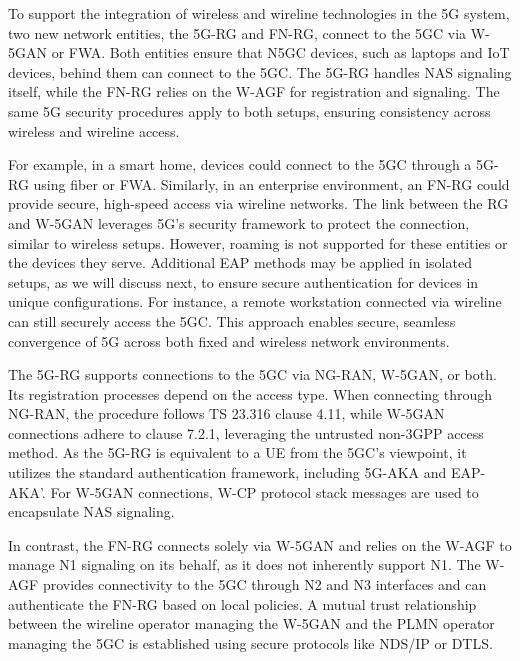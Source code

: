 To support the integration of wireless and wireline technologies in the \ac{5G} system, two new network entities, the \ac{5G-RG} and \ac{FN-RG}, connect to the \ac{5GC} via \ac{W-5GAN} or \ac{FWA}. Both entities ensure that \ac{N5GC} devices, such as laptops and \ac{IoT} devices, behind them can connect to the \ac{5GC}. The \ac{5G-RG} handles \ac{NAS} signaling itself, while the \ac{FN-RG} relies on the \ac{W-AGF} for registration and signaling. The same \ac{5G} security procedures apply to both setups, ensuring consistency across wireless and wireline access.

For example, in a smart home, devices could connect to the \ac{5GC} through a \ac{5G-RG} using fiber or \ac{FWA}. Similarly, in an enterprise environment, an \ac{FN-RG} could provide secure, high-speed access via wireline networks. The link between the \ac{RG} and \ac{W-5GAN} leverages \ac{5G}’s security framework to protect the connection, similar to wireless setups. However, roaming is not supported for these entities or the devices they serve. Additional \ac{EAP} methods may be applied in isolated setups, as we will discuss next, to ensure secure authentication for devices in unique configurations. For instance, a remote workstation connected via wireline can still securely access the \ac{5GC}. This approach enables secure, seamless convergence of \ac{5G} across both fixed and wireless network environments.

The \ac{5G-RG} supports connections to the \ac{5GC} via \ac{NG-RAN}, \ac{W-5GAN}, or both. Its registration processes depend on the access type. When connecting through \ac{NG-RAN}, the procedure follows TS 23.316 clause 4.11, while \ac{W-5GAN} connections adhere to clause 7.2.1, leveraging the untrusted non-\ac{3GPP} access method. As the \ac{5G-RG} is equivalent to a \ac{UE} from the \ac{5GC}’s viewpoint, it utilizes the standard authentication framework, including \ac{5G-AKA} and \ac{EAP-AKA’}. For \ac{W-5GAN} connections, \ac{W-CP} protocol stack messages are used to encapsulate \ac{NAS} signaling.

In contrast, the \ac{FN-RG} connects solely via \ac{W-5GAN} and relies on the \ac{W-AGF} to manage N1 signaling on its behalf, as it does not inherently support N1. The \ac{W-AGF} provides connectivity to the \ac{5GC} through N2 and N3 interfaces and can authenticate the \ac{FN-RG} based on local policies. A mutual trust relationship between the wireline operator managing the \ac{W-5GAN} and the \ac{PLMN} operator managing the \ac{5GC} is established using secure protocols like \ac{NDS/IP} or \ac{DTLS}.

